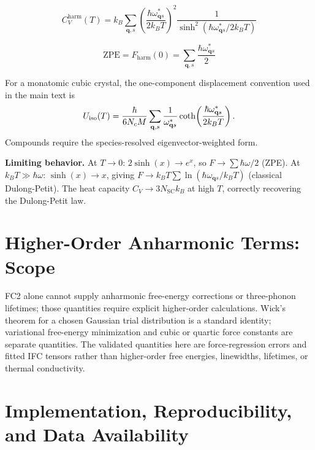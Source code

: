 \documentclass[aps,prb,reprint,amsmath,amssymb,floatfix]{revtex4-2}
\begin{document}
\begin{equation*}
C_V^\text{harm}(T) = k_B\sum_{\mathbf{q},s}\left(\frac{\hbar\omega_{\mathbf{q}s}^*}{2k_BT}\right)^2\frac{1}{\sinh^2\!\left(\hbar\omega_{\mathbf{q}s}^*/2k_BT\right)}
\end{equation*}

\begin{equation*}
\text{ZPE} = F_\text{harm}(0) = \sum_{\mathbf{q},s}\frac{\hbar\omega_{\mathbf{q}s}^*}{2}
\end{equation*}

\color{revisionblue}
For a monatomic cubic crystal, the one-component displacement convention used
in the main text is
\begin{equation*}
U_{\rm iso}(T)=\frac{\hbar}{6N_cM}\sum_{\mathbf q,s}
\frac{1}{\omega_{\mathbf q s}^*}
\coth\!\left(\frac{\hbar\omega_{\mathbf q s}^*}{2k_BT}\right).
\end{equation*}
Compounds require the species-resolved eigenvector-weighted form.
\color{black}

\textbf{Limiting behavior.} At \(T\to 0\): \(2\sinh(x)\to e^x\), so
\(F\to\sum\hbar\omega/2\) (ZPE). At \(k_BT\gg\hbar\omega\):
\(\sinh(x)\to x\), giving
\(F\to k_BT\sum\ln(\hbar\omega_{\mathbf{q}s}/k_BT)\) (classical
Dulong-Petit). The heat capacity \(C_V\to 3N_\text{SC}k_B\) at high
\(T\), correctly recovering the Dulong-Petit law.

\color{revisionblue}
\section{Higher-Order Anharmonic Terms: Scope}
\label{appendix-i-anharmonic-free-energy-wicks-theorem-and-perturbation-theory}
\color{black}

\color{revisionblue}
FC2 alone cannot supply anharmonic free-energy corrections or three-phonon
lifetimes; those quantities require explicit higher-order calculations. Wick's
theorem for a chosen Gaussian trial distribution is a standard identity;
variational free-energy minimization and cubic or quartic force constants are
separate quantities. The validated quantities here are force-regression errors
and fitted IFC tensors rather than higher-order free energies, linewidths,
lifetimes, or thermal conductivity.
\color{black}

\color{revisionblue}
\section{Implementation, Reproducibility, and Data Availability}
\label{appendix-k-reproducibility}
\color{black}
\end{document}
